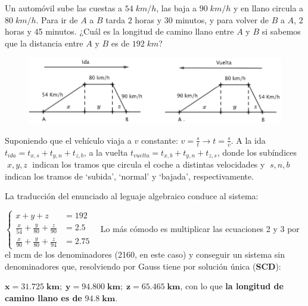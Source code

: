 \begin{ejre} 
Un automóvil sube las cuestas a $54\; km/h$, las baja a $90\; km/h$ y en llano circula a $80\;  km/h$. Para ir de $A$ a $B$ tarda $2$ horas y 30 minutos, y para volver de $B$ a $A$, 2 horas y 45 minutos. ¿Cuál es la longitud de camino llano entre $A$ y $B$ si sabemos que la distancia entre $A$ y $B$ es de $192\;  km$? 
\end{ejre}
\begin{proofw}\renewcommand{\qedsymbol}{$\diamond$}
\begin{figure}[H]
		\centering
		\includegraphics[width=.9\textwidth]{imagenes/imagenes01/T01IM06.png}
	\end{figure}

\vspace{-2mm}	

	Suponiendo que el vehículo viaja a $v$ constante: $v=\frac s t \to t=\frac s v$. A la ida $t_{ida}=t_{x,s}+t_{y,n}+t_{z,b}$, a la vuelta $t_{vuelta}=t_{x,b}+t_{y,n}+t_{z,s}$, donde los subíndices $\; x,y,z\; $ indican los tramos que circula el coche a distintas velocidades y $\; s,n,b\; $ indican los tramos de `subida', `normal' y `bajada', respectivamente.
	
	La traducción del enunciado al leguaje algebraico conduce al sistema:
	
	$\begin{cases} x+y+z&=192\\ \frac{x}{54} + \frac{y}{80}+\frac{z}{90}&=2.5 \\ \frac{x}{90}+\frac{y}{80}+\frac{z}{94}&=2.75   \end{cases} \; \; $
	Lo más cómodo es multiplicar las ecuaciones 2 y 3 por el mcm de los denominadores (2160, en este caso) y conseguir un sistema sin denominadores que, resolviendo por Gauss tiene por solución única (\textbf{SCD}):
	
	$\boldsymbol{x=31.725 \; km; \; y= 94.800 \; km; \; z= 65.465 \; km}$, con lo que \textbf{la longitud de camino llano es de} $\boldsymbol{94.8 \; km}$.
\end{proofw}


